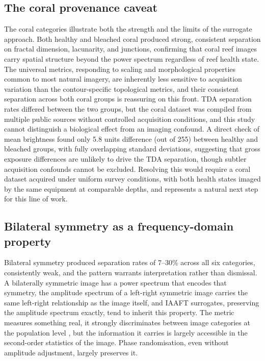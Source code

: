 \documentclass[a4paper,12pt]{article}
\begin{document}
\subsection{The coral provenance caveat}

The coral categories illustrate both the strength and the limits of the surrogate approach. Both healthy and bleached coral produced strong, consistent separation on fractal dimension, lacunarity, and junctions, confirming that coral reef images carry spatial structure beyond the power spectrum regardless of reef health state. The universal metrics, responding to scaling and morphological properties common to most natural imagery, are inherently less sensitive to acquisition variation than the contour-specific topological metrics, and their consistent separation across both coral groups is reassuring on this front. TDA separation rates differed between the two groups, but the coral dataset was compiled from multiple public sources without controlled acquisition conditions, and this study cannot distinguish a biological effect from an imaging confound. A direct check of mean brightness found only 5.8 units difference (out of 255) between healthy and bleached groups, with fully overlapping standard deviations, suggesting that gross exposure differences are unlikely to drive the TDA separation, though subtler acquisition confounds cannot be excluded. Resolving this would require a coral dataset acquired under uniform survey conditions, with both health states imaged by the same equipment at comparable depths, and represents a natural next step for this line of work.

\subsection{Bilateral symmetry as a frequency-domain property}

Bilateral symmetry produced separation rates of 7--30\% across all six categories, consistently weak, and the pattern warrants interpretation rather than dismissal. A bilaterally symmetric image has a power spectrum that encodes that symmetry, the amplitude spectrum of a left-right symmetric image carries the same left-right relationship as the image itself, and IAAFT surrogates, preserving the amplitude spectrum exactly, tend to inherit this property. The metric measures something real, it strongly discriminates between image categories at the population level \citep{cundill2026bilateral}, but the information it carries is largely accessible in the second-order statistics of the image. Phase randomisation, even without amplitude adjustment, largely preserves it.
\end{document}
